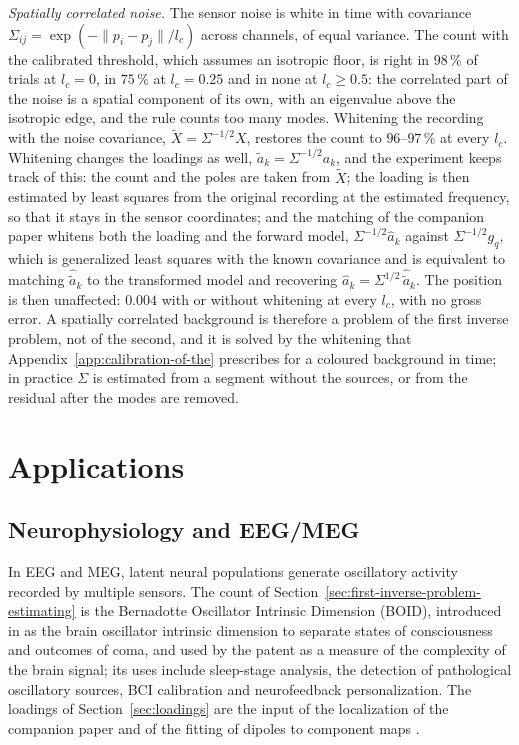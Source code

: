 \documentclass{article}
\begin{document}
\emph{Spatially correlated noise.} The sensor noise is white in time with covariance $\Sigma_{ij} = \exp(-\lVert p_i - p_j \rVert / l_c)$ across channels, of equal variance. The count with the calibrated threshold, which assumes an isotropic floor, is right in $98\,\%$ of trials at $l_c = 0$, in $75\,\%$ at $l_c = 0.25$ and in none at $l_c \ge 0.5$: the correlated part of the noise is a spatial component of its own, with an eigenvalue above the isotropic edge, and the rule counts too many modes. Whitening the recording with the noise covariance, $\widetilde{X} = \Sigma^{-1/2} X$, restores the count to $96$--$97\,\%$ at every $l_c$. Whitening changes the loadings as well, $\widetilde{a}_k = \Sigma^{-1/2} a_k$, and the experiment keeps track of this: the count and the poles are taken from $\widetilde{X}$; the loading is then estimated by least squares from the original recording at the estimated frequency, so that it stays in the sensor coordinates; and the matching of the companion paper whitens both the loading and the forward model, $\Sigma^{-1/2}\widehat{a}_k$ against $\Sigma^{-1/2} g_q$, which is generalized least squares with the known covariance and is equivalent to matching $\widehat{\widetilde{a}}_k$ to the transformed model and recovering $\widehat{a}_k = \Sigma^{1/2}\,\widehat{\widetilde{a}}_k$. The position is then unaffected: $0.004$ with or without whitening at every $l_c$, with no gross error. A spatially correlated background is therefore a problem of the first inverse problem, not of the second, and it is solved by the whitening that Appendix~\ref{app:calibration-of-the} prescribes for a coloured background in time; in practice $\Sigma$ is estimated from a segment without the sources, or from the residual after the modes are removed.

\section{Applications}\label{sec:applications}

\subsection{Neurophysiology and EEG/MEG}\label{sec:neurophysiology-and-eeg-meg}

In EEG and MEG, latent neural populations generate oscillatory activity recorded by multiple sensors. The count of Section~\ref{sec:first-inverse-problem-estimating} is the Bernadotte Oscillator Intrinsic Dimension (BOID), introduced in \cite{ref-Bernadotte07} as the brain oscillator intrinsic dimension to separate states of consciousness and outcomes of coma, and used by the patent \cite{pat-complexity} as a measure of the complexity of the brain signal; its uses include sleep-stage analysis, the detection of pathological oscillatory sources, BCI calibration and neurofeedback personalization. The loadings of Section~\ref{sec:loadings} are the input of the localization of the companion paper \cite{ref-companion} and of the fitting of dipoles to component maps \cite{ref-Delorme}.
\end{document}
